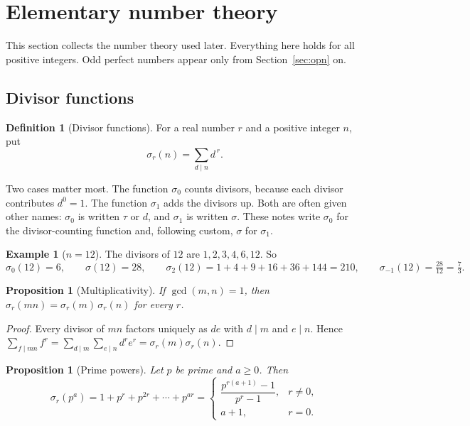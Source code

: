 \documentclass[11pt]{article}
\newtheorem{proposition}[theorem]{Proposition}
\theoremstyle{definition}
\newtheorem{definition}[theorem]{Definition}
\newtheorem{example}[theorem]{Example}
\theoremstyle{remark}
\begin{document}
\section{Elementary number theory}\label{sec:nt}

This section collects the number theory used later.  Everything here holds
for all positive integers.  Odd perfect numbers appear only from
Section~\ref{sec:opn} on.

\subsection{Divisor functions}\label{sec:divfun}

\begin{definition}[Divisor functions]
For a real number $r$ and a positive integer $n$, put
\[
\sigma_r(n)=\sum_{d\mid n}d^{\,r}.
\]
\end{definition}

Two cases matter most.  The function $\sigma_0$ counts divisors, because
each divisor contributes $d^0=1$.  The function $\sigma_1$ adds the divisors
up.  Both are often given other names: $\sigma_0$ is written $\tau$ or $d$,
and $\sigma_1$ is written $\sigma$.  These notes write $\sigma_0$ for the
divisor-counting function and, following custom, $\sigma$ for $\sigma_1$.

\begin{example}[$n=12$]\label{ex:sigma12}
The divisors of $12$ are $1,2,3,4,6,12$.  So
\[
\sigma_0(12)=6,\qquad \sigma(12)=28,\qquad
\sigma_2(12)=1+4+9+16+36+144=210,\qquad
\sigma_{-1}(12)=\tfrac{28}{12}=\tfrac73 .
\]
\end{example}

\begin{proposition}[Multiplicativity]\label{prop:sigma-mult}
If $\gcd(m,n)=1$, then $\sigma_r(mn)=\sigma_r(m)\,\sigma_r(n)$ for every $r$.
\end{proposition}

\begin{proof}
Every divisor of $mn$ factors uniquely as $de$ with $d\mid m$ and $e\mid n$.
Hence $\sum_{f\mid mn}f^r=\sum_{d\mid m}\sum_{e\mid n}d^re^r
=\sigma_r(m)\sigma_r(n)$.
\end{proof}

\begin{proposition}[Prime powers]\label{prop:sigma-pp}
Let $p$ be prime and $a\ge0$.  Then
\[
\sigma_r(p^a)=1+p^r+p^{2r}+\cdots+p^{ar}
=\begin{cases}\dfrac{p^{r(a+1)}-1}{p^r-1},& r\ne0,\\[8pt] a+1,& r=0.\end{cases}
\]
\end{proposition}
\end{document}
